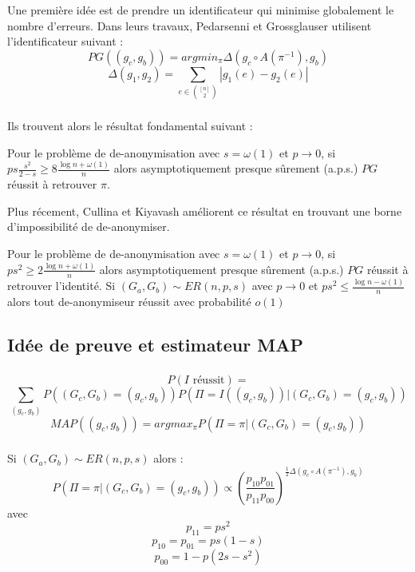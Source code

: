 \documentclass[11pt]{beamer}
\begin{document}
\begin{frame}
\frametitle{\insertsubsection}
Une première idée est de prendre un identificateur qui minimise globalement le nombre d'erreurs. Dans leurs travaux, Pedarsenni et Grossglauser utilisent l'identificateur suivant :
\[
PG((g_c,g_b)) = argmin_{\pi} \Delta(g_c \circ A(\pi^{-1}), g_b)
\]
\[
\Delta(g_1,g_2) = \sum_{e \in \binom{[n]}{2}} |g_1(e)-g_2(e)|
\]

\end{frame}

\begin{frame}
\frametitle{\insertsubsection}
Ils trouvent alors le résultat fondamental suivant :

\begin{theoreme}
Pour le problème de de-anonymisation avec $s = \omega(1)$ et $p \rightarrow 0$, si $ps \frac{s^2}{2-s} \geq 8\frac{\log n + \omega(1)}{n}$ alors asymptotiquement presque sûrement (a.p.s.) $PG$ réussit à retrouver $\pi$.
\end{theoreme}

Plus récement, Cullina et Kiyavash améliorent ce résultat en trouvant une borne d'impossibilité de de-anonymiser.

\begin{theoreme}
Pour le problème de de-anonymisation avec $s = \omega(1)$ et $p \rightarrow 0$, si $ps^2 \geq 2\frac{\log n + \omega(1)}{n}$ alors asymptotiquement presque sûrement (a.p.s.) $PG$ réussit à retrouver l'identité.
Si $(G_a,G_b) \sim ER(n,p,s)$ avec $p \rightarrow 0$ et $ps^2 \leq \frac{\log n - \omega(1)}{n}$ alors tout de-anonymiseur réussit avec probabilité $o(1)$
\end{theoreme}

\end{frame}

\subsection{Idée de preuve et estimateur MAP}

\begin{frame}
\frametitle{\insertsubsection}
\[
P(I \text{ réussit}) = \]\[\sum_{(g_c,g_b)} P((G_c,G_b) = (g_c,g_b)) P(\Pi = I((g_c,g_b)) |(G_c,G_b) = (g_c,g_b))
\]
\[
MAP((g_c,g_b))= argmax_{\pi} P(\Pi = \pi |(G_c,G_b) = (g_c,g_b))
\]
\end{frame}

\begin{frame}
\frametitle{\insertsubsection}
\begin{lemme}
Si $(G_a,G_b) \sim ER(n,p,s)$ alors :
\[
P(\Pi = \pi|(G_c,G_b) = (g_c,g_b)) \propto (\frac{p_{10}p_{01}}{p_{11}p_{00}})^{\frac{1}{2} \Delta(g_c \circ A(\pi^{-1}), g_b)}
\]
avec
\[
p_{11} = ps^2 
\]
\[
p_{10} = p_{01} = ps(1-s)
\]
\[
p_{00} = 1 - p(2s-s^2)
\]
\end{lemme}
\end{frame}
\end{document}
